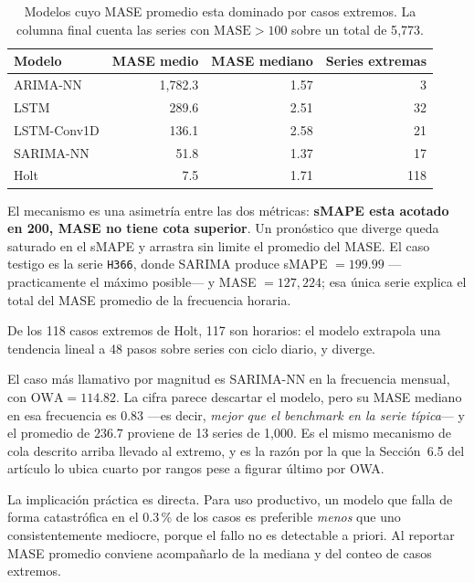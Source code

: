 \begin{table}[htbp]
\centering
\caption{Modelos cuyo MASE promedio esta dominado por casos extremos. La columna
final cuenta las series con $\mathrm{MASE}>100$ sobre un total de 5{,}773.}
\label{tab:extremos}
\begin{tabular}{lrrr}
\toprule
\textbf{Modelo} & \textbf{MASE medio} & \textbf{MASE mediano} & \textbf{Series extremas} \\
\midrule
ARIMA-NN     & 1{,}782.3 & 1.57 & 3 \\
LSTM         & 289.6     & 2.51 & 32 \\
LSTM-Conv1D  & 136.1     & 2.58 & 21 \\
SARIMA-NN    & 51.8      & 1.37 & 17 \\
Holt         & 7.5       & 1.71 & 118 \\
\bottomrule
\end{tabular}
\end{table}

El mecanismo es una asimetría entre las dos métricas: \textbf{sMAPE esta acotado en
200, MASE no tiene cota superior}. Un pronóstico que diverge queda saturado en el
sMAPE y arrastra sin limite el promedio del MASE. El caso testigo es la serie
\texttt{H366}, donde SARIMA produce sMAPE $=199.99$ ---practicamente el máximo
posible--- y MASE $=127{,}224$; esa única serie explica el total del MASE promedio
de la frecuencia horaria.

De los 118 casos extremos de Holt, 117 son horarios: el modelo extrapola una
tendencia lineal a 48 pasos sobre series con ciclo diario, y diverge.

El caso más llamativo por magnitud es SARIMA-NN en la frecuencia mensual, con
$\mathrm{OWA}=114.82$. La cifra parece descartar el modelo, pero su MASE mediano en esa
frecuencia es $0.83$ ---es decir, \emph{mejor que el benchmark en la serie típica}--- y
el promedio de $236.7$ proviene de 13 series de 1{,}000. Es el mismo mecanismo de cola
descrito arriba llevado al extremo, y es la razón por la que la
Sección~6.5 del artículo lo ubica cuarto por rangos pese a figurar último por OWA.

La implicación práctica es directa. Para uso productivo, un modelo que falla de
forma catastrófica en el 0.3\,\% de los casos es preferible \emph{menos} que uno
consistentemente mediocre, porque el fallo no es detectable a priori. Al reportar
MASE promedio conviene acompañarlo de la mediana y del conteo de casos extremos.

